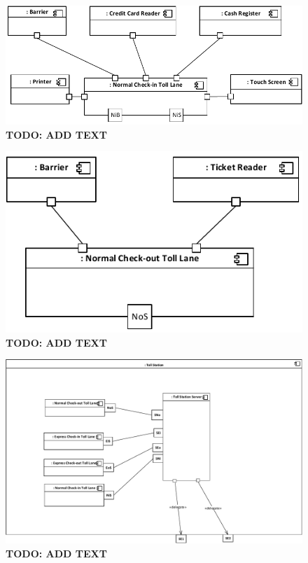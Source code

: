 \begin{figure}
\centerline{\includegraphics[width=\textwidth]{img/composite_structure_diagrams/cscd_toll_lane_normal_in}}
\caption{\textbf{TODO: ADD TEXT}}
\label{fig:csd_tlni}
\end{figure}

\begin{figure}
\centerline{\includegraphics[width=\textwidth]{img/composite_structure_diagrams/cscd_toll_lane_normal_out}}
\caption{\textbf{TODO: ADD TEXT}}
\label{fig:csd_tlno}
\end{figure}


\begin{figure}
\centerline{\includegraphics[width=\textwidth]{img/composite_structure_diagrams/cscd_toll_station}}
\caption{\textbf{TODO: ADD TEXT}}
\label{fig:csd_ts}
\end{figure}
